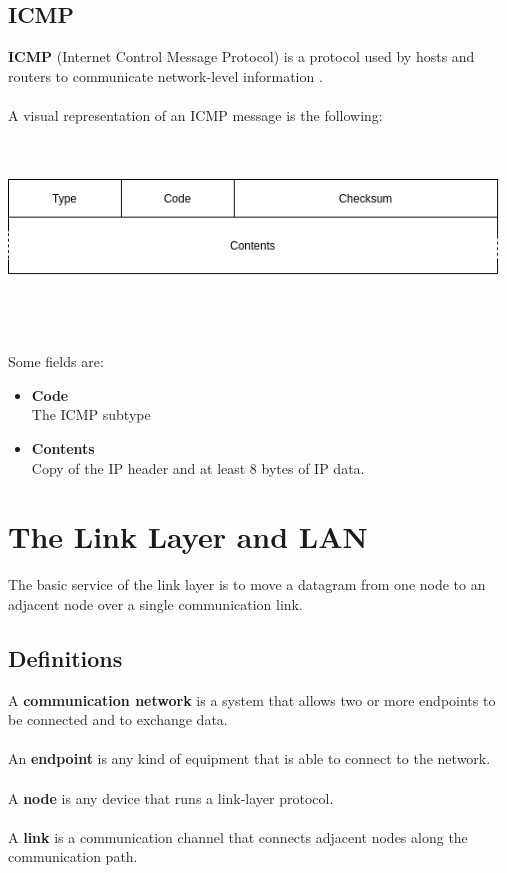 \documentclass{article}
\begin{document}
\subsection{ICMP}
\textbf{ICMP} (Internet Control Message Protocol) is a protocol used by hosts and routers to communicate network-level information . \\ \\
A visual representation of an ICMP message is the following: \\ \\ \\
\centerline{\includegraphics[width=13cm]{./assets/icmp.png}} \\ \\ \\
Some fields are:
\begin{itemize}
	\item \textbf{Code}
	\vspace{.2cm} \\
	The ICMP subtype
	
	\item \textbf{Contents}
	\vspace{.2cm} \\
	Copy of the IP header and at least 8 bytes of IP data.
\end{itemize}

\section{The Link Layer and LAN}
The basic service of the link layer is to move a datagram from one node to an adjacent node over a single communication link.

\subsection{Definitions}
A \textbf{communication network} is a system that allows two or more endpoints to be connected and to exchange data. \\ \\
An \textbf{endpoint} is any kind of equipment that is able to connect to the network. \\ \\
A \textbf{node} is any device that runs a link-layer protocol. \\ \\
A \textbf{link} is a communication channel that connects adjacent nodes along the communication path.
\end{document}
